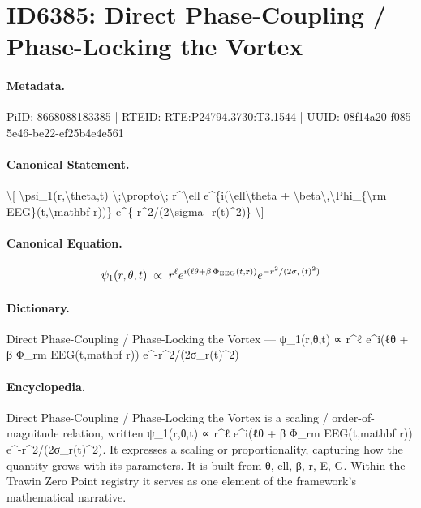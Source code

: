 \section*{ID6385: Direct Phase-Coupling / Phase-Locking the Vortex}
\paragraph{Metadata.}
PiID: 8668088183385 | RTEID: RTE:P24794.3730:T3.1544 | UUID: 08f14a20-f085-5e46-be22-ef25b4e4e561

\paragraph{Canonical Statement.}
\textbackslash{}[ \textbackslash{}psi\_1(r,\textbackslash{}theta,t) \textbackslash{};\textbackslash{}propto\textbackslash{}; r\textasciicircum{}\textbackslash{}ell e\textasciicircum{}\{i(\textbackslash{}ell\textbackslash{}theta + \textbackslash{}beta\textbackslash{},\textbackslash{}Phi\_\{\textbackslash{}rm EEG\}(t,\textbackslash{}mathbf r))\} e\textasciicircum{}\{-r\textasciicircum{}2/(2\textbackslash{}sigma\_r(t)\textasciicircum{}2)\} \textbackslash{}]

\paragraph{Canonical Equation.}
\[
\psi_1(r,\theta,t) \;\propto\; r^\ell e^{i(\ell\theta + \beta\,\Phi_{\rm EEG}(t,\mathbf r))} e^{-r^2/(2\sigma_r(t)^2)}
\]

\paragraph{Dictionary.}
Direct Phase-Coupling / Phase-Locking the Vortex — ψ\_1(r,θ,t) ∝ r\textasciicircum{}ℓ e\textasciicircum{}i(ℓθ + β Φ\_rm EEG(t,mathbf r)) e\textasciicircum{}-r\textasciicircum{}2/(2σ\_r(t)\textasciicircum{}2)

\paragraph{Encyclopedia.}
Direct Phase-Coupling / Phase-Locking the Vortex is a scaling / order-of-magnitude relation, written ψ\_1(r,θ,t) ∝ r\textasciicircum{}ℓ e\textasciicircum{}i(ℓθ + β Φ\_rm EEG(t,mathbf r)) e\textasciicircum{}-r\textasciicircum{}2/(2σ\_r(t)\textasciicircum{}2). It expresses a scaling or proportionality, capturing how the quantity grows with its parameters. It is built from θ, ell, β, r, E, G. Within the Trawin Zero Point registry it serves as one element of the framework's mathematical narrative.
